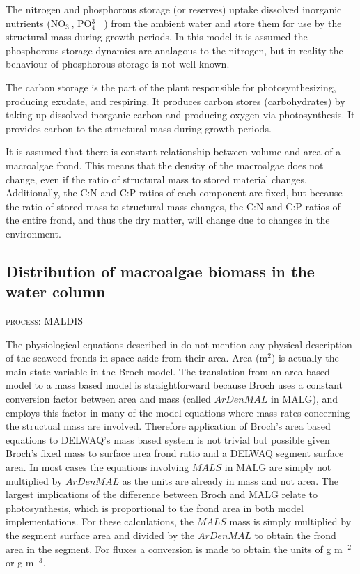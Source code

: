 \documentclass{deltares_manual}
\begin{document}
The nitrogen and phosphorous storage (or reserves) uptake dissolved inorganic nutrients (NO$_{3}^{-}$, PO$_{4}^{3-}$) from the ambient water and store them for use by the structural mass during growth periods. In this model it is assumed the phosphorous storage dynamics are analagous to the nitrogen, but in reality the behaviour of phosphorous storage is not well known.

The carbon storage is the part of the plant responsible for photosynthesizing, producing exudate, and respiring. It produces carbon stores (carbohydrates) by taking up dissolved inorganic carbon and producing oxygen via photosynthesis. It provides carbon to the structural mass during growth periods. 

It is assumed that there is constant relationship between volume and area of a macroalgae frond. This means that the density of the macroalgae does not change, even if the ratio of structural mass to stored material changes. Additionally, the C:N and C:P ratios of each component are fixed, but because the ratio of stored mass to structural mass changes, the C:N and C:P ratios of the entire frond, and thus the dry matter, will change due to changes in the environment.
\pagebreak

\subsection{Distribution of macroalgae biomass in the water column}
\begin{flushright}
	\textsc{process: MALDIS}
\end{flushright}
The physiological equations described in \cite{broch2012} do not mention any physical description of the seaweed fronds in space aside from their area. Area (m$^{2}$) is actually the main state variable in the Broch model. The translation from an area based model to a mass based model is straightforward because Broch uses a constant conversion factor between area and mass (called $ArDenMAL$ in MALG), and employs this factor in many of the model equations where mass rates concerning the structual mass are involved. Therefore application of Broch's area based equations to DELWAQ's mass based system is not trivial but possible given Broch's fixed mass to surface area frond ratio and a DELWAQ segment surface area. In most cases the equations involving $MALS$ in MALG are simply not multiplied by $ArDenMAL$ as the units are already in mass and not area. The largest implications of the difference between Broch and MALG relate to photosynthesis, which is proportional to the frond area in both model implementations. For these calculations, the $MALS$ mass is simply multiplied by the segment surface area and divided by the $ArDenMAL$ to obtain the frond area in the segment. For fluxes a conversion is made to obtain the units of g m$^{-2}$ or g m$^{-3}$.  
\end{document}
